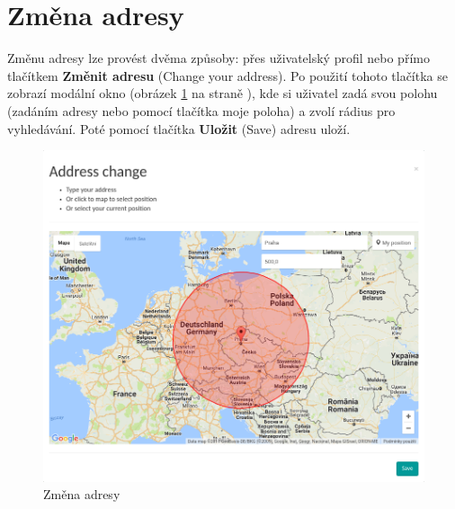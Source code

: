 \section{Změna adresy}

\label{nur:address-change}

Změnu adresy lze provést dvěma způsoby: přes uživatelský profil nebo přímo tlačítkem \textbf{Změnit adresu} (Change your address). Po použití tohoto tlačítka se zobrazí modální okno (obrázek \ref{fig:tur:address-change} na straně \pageref{fig:tur:address-change}), kde si uživatel zadá svou polohu (zadáním adresy nebo pomocí tlačítka moje poloha) a zvolí rádius pro vyhledávání. Poté pomocí tlačítka \textbf{Uložit} (Save) adresu uloží.

\begin{figure}[!h]
    \centering
    \includegraphics[width=1.0\textwidth]{media/tur/address-change.png}
    \caption{Změna adresy}
    \label{fig:tur:address-change}
\end{figure}